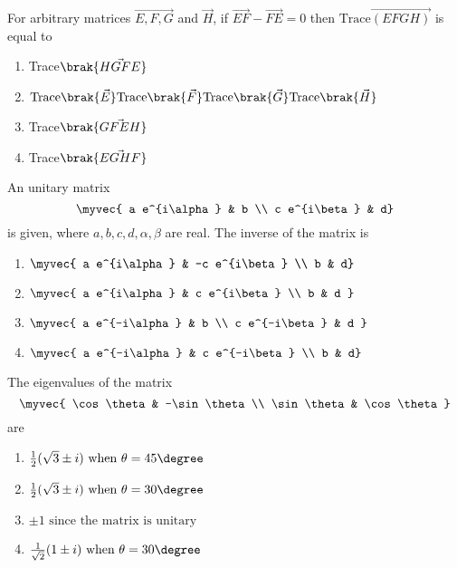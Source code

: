     \item For arbitrary matrices $\vec{E,F,G}$ and $\vec{H}$, if $\vec{EF}-\vec{FE}=0$ then $\text{Trace}\vec{(EFGH)}$ is equal to

    \hfill{}
    \begin{multicols}{2}
    \begin{enumerate}
	    \item Trace$\brak{\vec{HGFE}}$
	    \item $\text{Trace}\brak{\vec{E}}\text{Trace}\brak{\vec{F}}\text{Trace}\brak{\vec{G}}\text{Trace}\brak{\vec{H}}$
	    \item Trace$\brak{\vec{GFEH}}$
	    \item Trace$\brak{\vec{EGHF}}$
    \end{enumerate}
    \end{multicols}
    \item An unitary matrix
	    $$\myvec{
a e^{i\alpha} & b \\
c e^{i\beta} & d}
$$
is given, where \(a, b, c, d, \alpha, \beta\) are real. The inverse of the matrix is
\hfill{}
\begin{multicols}{4}
    \begin{enumerate}
\item
$\myvec{
a e^{i\alpha} & -c e^{i\beta} \\
b & d}
$
\item 
$\myvec{
a e^{i\alpha} & c e^{i\beta} \\
b & d
}$
\item
$\myvec{
a e^{-i\alpha} & b \\
c e^{-i\beta} & d
}$
\item
$\myvec{
a e^{-i\alpha} & c e^{-i\beta} \\
b & d}
$
 \end{enumerate}
    \end{multicols}
\item The eigenvalues of the matrix 
	$$
 \myvec{
\cos\theta & -\sin\theta \\ \sin\theta & \cos\theta 
}$$
are
\hfill{}
\begin{multicols}{2}
    \begin{enumerate}
        \item $\frac{1}{2}(\sqrt{3} \pm i) \text{ when } \theta = 45\degree$
        \item $\frac{1}{2}(\sqrt{3} \pm i) \text{ when } \theta = 30\degree$
        \item $\pm 1 \text{ since the matrix is unitary}$
        \item $\frac{1}{\sqrt{2}} (1 \pm i) \text{ when } \theta = 30\degree$
    \end{enumerate}
\end{multicols}
